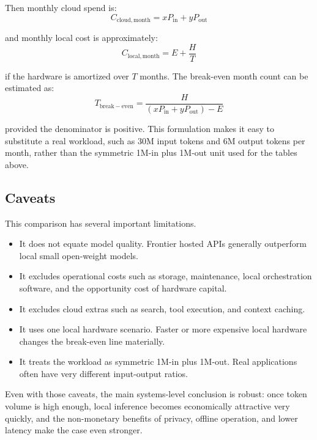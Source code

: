 \documentclass[11pt,a4paper]{article}
\begin{document}
Then monthly cloud spend is:
\begin{equation}
C_{\mathrm{cloud,month}} = xP_{\mathrm{in}} + yP_{\mathrm{out}}
\end{equation}

and monthly local cost is approximately:
\begin{equation}
C_{\mathrm{local,month}} = E + \frac{H}{T}
\end{equation}

if the hardware is amortized over $T$ months. The break-even month count can be estimated as:
\begin{equation}
T_{\mathrm{break-even}} = \frac{H}{(xP_{\mathrm{in}} + yP_{\mathrm{out}}) - E}
\end{equation}

provided the denominator is positive. This formulation makes it easy to substitute a real workload, such as 30M input tokens and 6M output tokens per month, rather than the symmetric 1M-in plus 1M-out unit used for the tables above.

\subsection{Caveats}

This comparison has several important limitations.
\begin{itemize}[noitemsep]
    \item It does not equate model quality. Frontier hosted APIs generally outperform local small open-weight models.
    \item It excludes operational costs such as storage, maintenance, local orchestration software, and the opportunity cost of hardware capital.
    \item It excludes cloud extras such as search, tool execution, and context caching.
    \item It uses one local hardware scenario. Faster or more expensive local hardware changes the break-even line materially.
    \item It treats the workload as symmetric 1M-in plus 1M-out. Real applications often have very different input-output ratios.
\end{itemize}

Even with those caveats, the main systems-level conclusion is robust: once token volume is high enough, local inference becomes economically attractive very quickly, and the non-monetary benefits of privacy, offline operation, and lower latency make the case even stronger.
\end{document}
